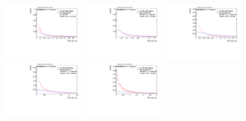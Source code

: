 \begin{figure}[H]
\bigskip
\includegraphics[width=0.3\textwidth]{sascha_input/Appendix/Distributions/higgs/distributions/beta3/h_assisted_tj_D2_3_bin1.pdf} \hspace{1mm}
\includegraphics[width=0.3\textwidth]{sascha_input/Appendix/Distributions/higgs/distributions/beta3/h_assisted_tj_D2_3_bin2.pdf} \hspace{4mm}
\includegraphics[width=0.3\textwidth]{sascha_input/Appendix/Distributions/higgs/distributions/beta3/h_assisted_tj_D2_3_bin3.pdf} 
\bigskip
\includegraphics[width=0.3\textwidth]{sascha_input/Appendix/Distributions/higgs/distributions/beta3/h_assisted_tj_D2_3_bin4.pdf} \hspace{4mm}
\includegraphics[width=0.3\textwidth]{sascha_input/Appendix/Distributions/higgs/distributions/beta3/h_assisted_tj_D2_3_bin5.pdf} 


\end{figure}
